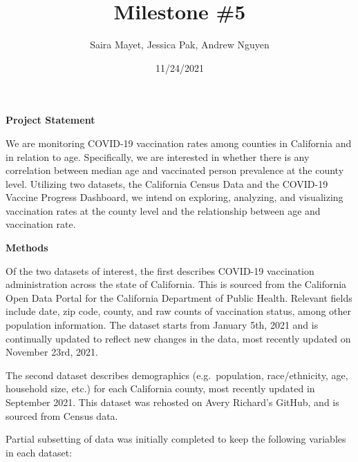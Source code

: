 \documentclass[
  ignorenonframetext,
]{beamer}
\title{Milestone \#5}
\author{Saira Mayet, Jessica Pak, Andrew Nguyen}
\date{11/24/2021}
\begin{document}
\frame{\titlepage}

\begin{frame}
\textbf{Project Statement}

We are monitoring COVID-19 vaccination rates among counties in
California and in relation to age. Specifically, we are interested in
whether there is any correlation between median age and vaccinated
person prevalence at the county level. Utilizing two datasets, the
California Census Data and the COVID-19 Vaccine Progress Dashboard, we
intend on exploring, analyzing, and visualizing vaccination rates at the
county level and the relationship between age and vaccination rate.
\end{frame}

\begin{frame}
\textbf{Methods}

Of the two datasets of interest, the first describes COVID-19
vaccination administration across the state of California. This is
sourced from the California Open Data Portal for the California
Department of Public Health. Relevant fields include date, zip code,
county, and raw counts of vaccination status, among other population
information. The dataset starts from January 5th, 2021 and is
continually updated to reflect new changes in the data, most recently
updated on November 23rd, 2021.

The second dataset describes demographics (e.g.~population,
race/ethnicity, age, household size, etc.) for each California county,
most recently updated in September 2021. This dataset was rehosted on
Avery Richard's GitHub, and is sourced from Census data.

Partial subsetting of data was initially completed to keep the following
variables in each dataset:
\end{frame}
\end{document}
